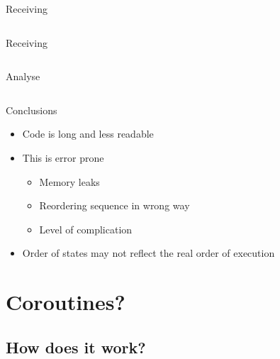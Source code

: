 \documentclass{beamer}
\begin{document}
\begin{frame}{Receiving}
    {
      \begin{columns}
         \begin{column}{1.0\textwidth}
               \begin{block}{Receiving}
                  \scalebox{0.8} {
                     
                  }
               \end{block}
         \end{column}
      \end{columns}
   }
    {
      \begin{columns}
         \begin{column}{1.0\textwidth}
               \begin{block}{Analyse}
                  
               \end{block}
         \end{column}
      \end{columns}
   }   
\end{frame}

\begin{frame}{Conclusions}
   \begin{itemize}[<+->]
      \item Code is long and less readable
      \item This is error prone
         \begin{itemize}[<+->]
            \item Memory leaks
            \item Reordering sequence in wrong way
            \item Level of complication
         \end{itemize}
      \item Order of states may not reflect the real order of execution
   \end{itemize}
\end{frame}

\section{ Coroutines? }

\subsection{ How does it work? }
\end{document}
